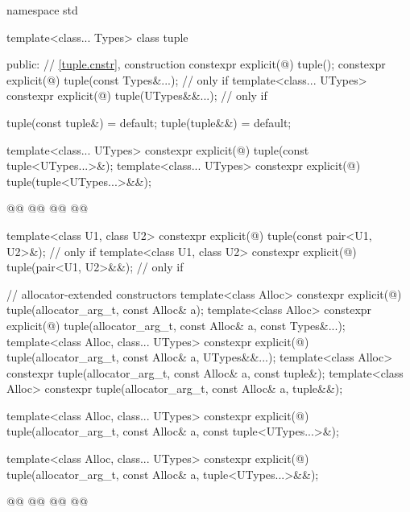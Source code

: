 \documentclass{wg21}
\begin{document}
\begin{codeblock}
namespace std {
template<class... Types>
class tuple {
    public:
    // \ref{tuple.cnstr},  construction
    constexpr explicit(@\seebelow@) tuple();
    constexpr explicit(@\seebelow@) tuple(const Types&...);
     // only if 
    template<class... UTypes>
    constexpr explicit(@\seebelow@) tuple(UTypes&&...);
    // only if 

    tuple(const tuple&) = default;
    tuple(tuple&&) = default;

    template<class... UTypes>
    constexpr explicit(@\seebelow@) tuple(const tuple<UTypes...>&);
    template<class... UTypes>
    constexpr explicit(@\seebelow@) tuple(tuple<UTypes...>&&);
    
    @@
    @@
    @@
    @@
    
    template<class U1, class U2>
    constexpr explicit(@\seebelow@)
    tuple(const pair<U1, U2>&);   // only if 
    template<class U1, class U2>
    constexpr explicit(@\seebelow@)
    tuple(pair<U1, U2>&&);        // only if 

    // allocator-extended constructors
    template<class Alloc>
    constexpr explicit(@\seebelow@)
    tuple(allocator_arg_t, const Alloc& a);
    template<class Alloc>
    constexpr explicit(@\seebelow@)
    tuple(allocator_arg_t, const Alloc& a, const Types&...);
    template<class Alloc, class... UTypes>
    constexpr explicit(@\seebelow@)
    tuple(allocator_arg_t, const Alloc& a, UTypes&&...);
    template<class Alloc>
    constexpr tuple(allocator_arg_t, const Alloc& a, const tuple&);
    template<class Alloc>
    constexpr tuple(allocator_arg_t, const Alloc& a, tuple&&);

    template<class Alloc, class... UTypes>
    constexpr explicit(@\seebelow@)
    tuple(allocator_arg_t, const Alloc& a, const tuple<UTypes...>&);

    template<class Alloc, class... UTypes>
    constexpr explicit(@\seebelow@)
    tuple(allocator_arg_t, const Alloc& a, tuple<UTypes...>&&);
    
    @@
    @@
    @@
    @@
    
}}
\end{codeblock}
\end{document}
